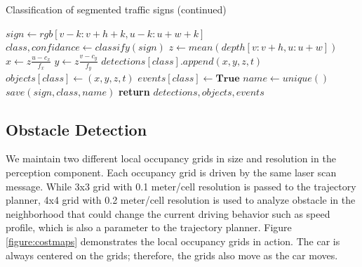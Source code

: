 \begin{algorithm}
\ContinuedFloat
\caption{Classification of segmented traffic signs (continued)}
  \begin{algorithmic}
      \State $sign \gets rgb[v-k:v+h+k, u-k:u+w+k]$
      \State $class, confidance \gets classify(sign)$
        \State $z \gets mean(depth[v:v+h, u:u+w])$
        \State $x \gets z\frac{u-c_x}{f_x}$
        \State $y \gets z\frac{v-c_y}{f_y}$
        \State $detections[class].append(x, y, z, t)$
          \State $objects[class] \gets (x, y, z, t)$
          \State $events[class] \gets \textbf{True}$
            \State $name \gets unique()$
            \State $save(sign, class, name)$
          \EndIf
        \EndIf
      \EndIf
    \EndFor
    \State \textbf{return} $detections, objects, events$
    \EndProcedure
  \end{algorithmic}
\end{algorithm}

\subsection{Obstacle Detection}

We maintain two different local occupancy grids in size and resolution in the
perception component. Each occupancy grid is driven by the same laser scan
message. While 3x3 grid with 0.1 meter/cell resolution is passed to the
trajectory planner, 4x4 grid with 0.2 meter/cell resolution is used to analyze
obstacle in the neighborhood that could change the current driving behavior
such as speed profile, which is also a parameter to the trajectory planner.
Figure \ref{figure:costmaps} demonstrates the local occupancy grids in action.
The car is always centered on the grids; therefore, the grids also move as the
car moves.

